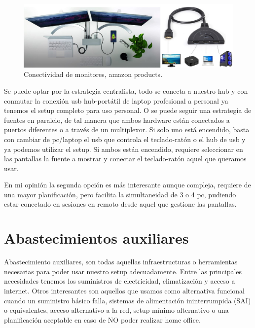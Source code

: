 \begin{figure}[!htb]
\begin{center}
\includegraphics[width=1\textwidth]{./figuras/conectividad_monitores.jpg}
\caption{ Conectividad de monitores, amazon products.}
\label{F:conectividad_monitores}
\end{center}
\end{figure}

Se puede optar por la estrategia centralista, todo se conecta a nuestro hub y con conmutar la conexión usb hub-portátil de laptop profesional a personal ya tenemos el setup completo para uso personal. O se puede seguir una estrategia de fuentes en paralelo, de tal manera que ambos hardware están conectados a puertos diferentes o a través de un multiplexor. Si solo uno está encendido, basta con cambiar de pc/laptop el usb que controla el teclado-ratón o el hub de usb y ya podemos utilizar el setup. Si ambos están encendido, requiere seleccionar en las pantallas la fuente a mostrar y conectar el teclado-ratón aquel que queramos usar.

En mi opinión la segunda opción es más interesante aunque compleja, requiere de una mayor planificación, pero facilita la simultaneidad de 3 o 4 pc, pudiendo estar conectado en sesiones en remoto desde aquel que gestione las pantallas.

\section{Abastecimientos auxiliares}\label{S:abastecimientos_auxiliares}
Abastecimiento auxiliares, son todas aquellas infraestructuras o herramientas necesarias para poder usar nuestro setup adecuadamente. Entre las principales necesidades tenemos los suministros de electricidad, climatización y acceso a internet. Otros interesantes son aquellos que usamos como alternativa funcional cuando un suministro básico falla, sistemas de alimentación ininterrumpida (SAI) o equivalentes, acceso alternativo a la red, setup mínimo alternativo o una planificación aceptable en caso de NO poder realizar home office. 

